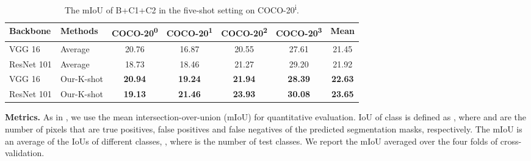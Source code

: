 \documentclass[10pt,twocolumn,letterpaper]{article}
\begin{document}
\begin{table*}[t]
  \centering
  \begin{tabular}{l|l|cccc|c}
    \hline
    \hline
     \textbf{Backbone} & \textbf{Methods} & \textbf{COCO-20\textsuperscript{0}} & \textbf{COCO-20\textsuperscript{1}} & \textbf{COCO-20\textsuperscript{2}} & \textbf{COCO-20\textsuperscript{3}} & \textbf{Mean} \\
    \hline
    VGG 16 & Average & 20.76 & 16.87 & 20.55  & 27.61 & 21.45 \\
    ResNet 101 & Average & 18.73  & 18.46 & 21.27 & 29.20  &  21.92 \\
    \hline
    VGG 16 & Our-K-shot & \textbf{20.94}  & \textbf{19.24} & \textbf{21.94}  & \textbf{28.39} & \textbf{22.63} \\
    ResNet 101 & Our-K-shot & \textbf{19.13}  & \textbf{21.46} & \textbf{23.93}  & \textbf{30.08} & \textbf{23.65} \\
    \hline
    \hline
  \end{tabular}
  \caption{The mIoU of B+C1+C2 in the five-shot setting on COCO-20\textsuperscript{i}.}\label{tab:result_coco_five}
\end{table*}


{\bf Metrics.} As in  \cite{shaban2017one,rakelly2018conditional,dong2018few}, we use the mean intersection-over-union (mIoU) for quantitative evaluation. IoU of class  is defined  as , where  and  are the number of pixels that are true positives, false positives and false negatives of the predicted segmentation masks, respectively. The mIoU is an average of the IoUs of different classes,  , where  is the number of test classes. We report the mIoU averaged over the four folds of cross-validation. 
\end{document}
